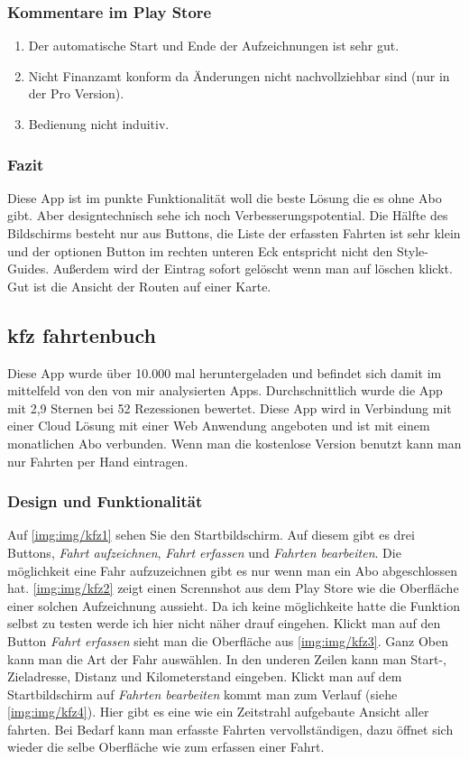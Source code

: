 \documentclass[a4paper]{article}
\begin{document}
\subsubsection{Kommentare im Play Store}
\begin{enumerate}
    \item Der automatische Start und Ende der Aufzeichnungen ist sehr gut.
    \item Nicht Finanzamt konform da Änderungen nicht nachvollziehbar sind (nur in der Pro Version).
    \item Bedienung nicht induitiv.
\end{enumerate}

\subsubsection{Fazit}
Diese App ist im punkte Funktionalität woll die beste Lösung die es ohne Abo gibt. Aber designtechnisch
sehe ich noch Verbesserungspotential. Die Hälfte des Bildschirms besteht nur aus Buttons, die Liste
der erfassten Fahrten ist sehr klein und der optionen Button im rechten unteren Eck entspricht nicht
den Style-Guides. Außerdem wird der Eintrag sofort gelöscht wenn man auf löschen klickt. Gut ist die
Ansicht der Routen auf einer Karte.

\subsection{kfz fahrtenbuch}
Diese App wurde über 10.000 mal heruntergeladen und befindet sich damit im mittelfeld von den von mir
analysierten Apps. Durchschnittlich wurde die App mit 2,9 Sternen bei 52 Rezessionen bewertet.
Diese App wird in Verbindung mit einer Cloud Lösung mit einer Web Anwendung angeboten und ist mit einem
monatlichen Abo verbunden. Wenn man die kostenlose Version benutzt kann man nur Fahrten per Hand eintragen.

\subsubsection{Design und Funktionalität}
Auf \ref{img:img/kfz1} sehen Sie den Startbildschirm. Auf diesem gibt es drei Buttons, \textit{Fahrt aufzeichnen},
\textit{Fahrt erfassen} und \textit{Fahrten bearbeiten}. Die möglichkeit eine Fahr aufzuzeichnen gibt es nur
wenn man ein Abo abgeschlossen hat. \ref{img:img/kfz2} zeigt einen Scrennshot aus dem Play Store wie die Oberfläche
einer solchen Aufzeichnung aussieht. Da ich keine möglichkeite hatte die Funktion selbst zu testen werde ich hier nicht
näher drauf eingehen. Klickt man auf den Button \textit{Fahrt erfassen} sieht man die Oberfläche aus \ref{img:img/kfz3}.
Ganz Oben kann man die Art der Fahr auswählen. In den underen Zeilen kann man Start-, Zieladresse, Distanz und Kilometerstand
eingeben. Klickt man auf dem Startbildschirm auf \textit{Fahrten bearbeiten} kommt man zum Verlauf (siehe \ref{img:img/kfz4}).
Hier gibt es eine wie ein Zeitstrahl aufgebaute Ansicht aller fahrten. Bei Bedarf kann man erfasste Fahrten vervollständigen,
dazu öffnet sich wieder die selbe Oberfläche wie zum erfassen einer Fahrt.
\end{document}
